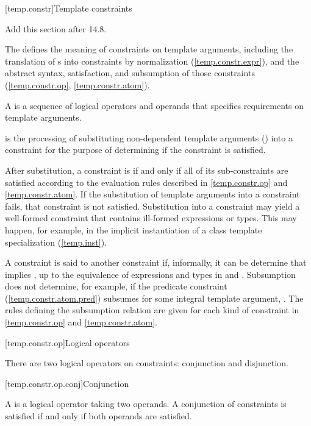 [temp.constr]{Template constraints}

Add this section after 14.8.

\pnum
\enternote
The defines the meaning of constraints on template arguments, including
the translation of s
into constraints by normalization (\ref{temp.constr.expr}),
and the abstract syntax, satisfaction, and subsumption of those constraints
(\ref{temp.constr.op}, \ref{temp.constr.atom}).
\exitnote


\pnum
 A  is a sequence of logical operators and 
operands that specifies requirements on template arguments. 

\pnum
{} is the processing of substituting 
non-dependent template arguments () 
into a constraint for the purpose of determining if the constraint
is satisfied.

After substitution, a constraint is  if and only if 
all of its sub-constraints are satisfied according to the evaluation 
rules described in
\ref{temp.constr.op} and
\ref{temp.constr.atom}.
% 
If the substitution of template arguments into a constraint fails, 
that constraint is not satisfied.
% 
\enternote
Substitution into a constraint may yield a well-formed constraint that
contains ill-formed expressions or types. This may happen, for
example, in the implicit instantiation of a class template
specialization (\ref{temp.inst}).
\exitnote


\pnum
A constraint  is said to  another
constraint  if, informally, it can be determine that
 implies , up to the equivalence of
expressions and types in  and .
% 
\enternote
Subsumption does not determine, for example, if the predicate 
constraint (\ref{temp.constr.atom.pred}) 
 subsumes  for 
some integral template argument, . 
\exitnote
The rules defining the subsumption relation are given for each kind
of constraint in
\ref{temp.constr.op} and
\ref{temp.constr.atom}.


[temp.constr.op]{Logical operators}

\pnum
There are two logical operators on constraints: conjunction and disjunction.

[temp.constr.op.conj]{Conjunction}

\pnum
A  is a logical operator taking two 
operands. A conjunction of constraints is satisfied if and only 
if both operands are satisfied. 

